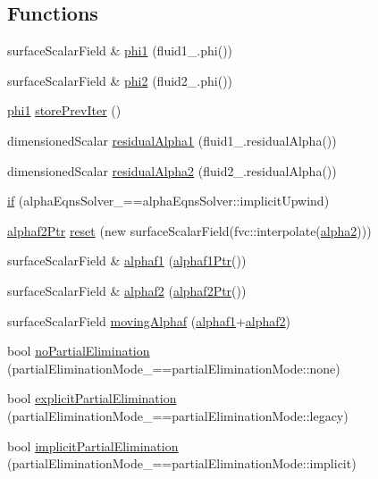 \subsection*{Functions}
\begin{DoxyCompactItemize}
\item 
surface\+Scalar\+Field \& \hyperlink{refsAndControls__2p_8H_aaf6a6a2ee3cff53881bc1adab47f2a9a}{phi1} (fluid1\+\_\+.\+phi())
\item 
surface\+Scalar\+Field \& \hyperlink{refsAndControls__2p_8H_adb57687d5d74249f550cb14883eebe4d}{phi2} (fluid2\+\_\+.\+phi())
\item 
\hyperlink{refsAndControls__2p_8H_aaf6a6a2ee3cff53881bc1adab47f2a9a}{phi1} \hyperlink{refsAndControls__2p_8H_ae182a84a785a24fe103ccb8a414b9b1e}{store\+Prev\+Iter} ()
\item 
dimensioned\+Scalar \hyperlink{refsAndControls__2p_8H_a39053abc52660ee0829d85d9a9704f32}{residual\+Alpha1} (fluid1\+\_\+.\+residual\+Alpha())
\item 
dimensioned\+Scalar \hyperlink{refsAndControls__2p_8H_a960fdd6ecc9e71702c858667a416d298}{residual\+Alpha2} (fluid2\+\_\+.\+residual\+Alpha())
\item 
\hyperlink{refsAndControls__2p_8H_ae2cb557eb79891d0d98b62428f4b2e46}{if} (alpha\+Eqns\+Solver\+\_\+==alpha\+Eqns\+Solver\+::implicit\+Upwind)
\item 
\hyperlink{refsAndControls__2p_8H_ac8b93dc9a33a53440d41ca437c0a03c9}{alphaf2\+Ptr} \hyperlink{refsAndControls__2p_8H_a34866f43591ebff731fb5bcc6aa6304f}{reset} (new surface\+Scalar\+Field(fvc\+::interpolate(\hyperlink{UEqns__2p_8H_abe544d8197b804c4439afde6d860d5d7}{alpha2})))
\item 
surface\+Scalar\+Field \& \hyperlink{refsAndControls__2p_8H_af5ff2b878e8d79c2bd7cf5385f55ea99}{alphaf1} (\hyperlink{refsAndControls__2p_8H_af3c259085af2100505920007f2efd8d5}{alphaf1\+Ptr}())
\item 
surface\+Scalar\+Field \& \hyperlink{refsAndControls__2p_8H_afc54ce6b2d45999d802074c7c4d86cc8}{alphaf2} (\hyperlink{refsAndControls__2p_8H_ac8b93dc9a33a53440d41ca437c0a03c9}{alphaf2\+Ptr}())
\item 
surface\+Scalar\+Field \hyperlink{refsAndControls__2p_8H_a698564459013ee34ed0ecc1254f98096}{moving\+Alphaf} (\hyperlink{refsAndControls__2p_8H_af5ff2b878e8d79c2bd7cf5385f55ea99}{alphaf1}+\hyperlink{refsAndControls__2p_8H_afc54ce6b2d45999d802074c7c4d86cc8}{alphaf2})
\item 
bool \hyperlink{refsAndControls__2p_8H_a77d2c33ada57ad5bc9e564897be0988b}{no\+Partial\+Elimination} (partial\+Elimination\+Mode\+\_\+==partial\+Elimination\+Mode\+::none)
\item 
bool \hyperlink{refsAndControls__2p_8H_a848d696fbffa5bcc71494268599c3005}{explicit\+Partial\+Elimination} (partial\+Elimination\+Mode\+\_\+==partial\+Elimination\+Mode\+::legacy)
\item 
bool \hyperlink{refsAndControls__2p_8H_a1d4f14edd4b410f2e95c2b58e5e49210}{implicit\+Partial\+Elimination} (partial\+Elimination\+Mode\+\_\+==partial\+Elimination\+Mode\+::implicit)
\end{DoxyCompactItemize}
